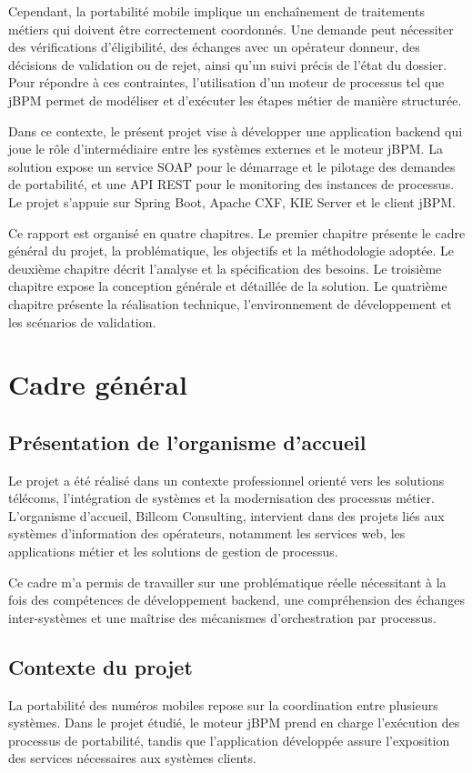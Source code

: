 \documentclass[12pt,a4paper]{report}
\begin{document}
Cependant, la portabilité mobile implique un enchaînement de traitements métiers qui doivent être correctement coordonnés. Une demande peut nécessiter des vérifications d'éligibilité, des échanges avec un opérateur donneur, des décisions de validation ou de rejet, ainsi qu'un suivi précis de l'état du dossier. Pour répondre à ces contraintes, l'utilisation d'un moteur de processus tel que jBPM permet de modéliser et d'exécuter les étapes métier de manière structurée.

Dans ce contexte, le présent projet vise à développer une application backend qui joue le rôle d'intermédiaire entre les systèmes externes et le moteur jBPM. La solution expose un service SOAP pour le démarrage et le pilotage des demandes de portabilité, et une API REST pour le monitoring des instances de processus. Le projet s'appuie sur Spring Boot, Apache CXF, KIE Server et le client jBPM.

Ce rapport est organisé en quatre chapitres. Le premier chapitre présente le cadre général du projet, la problématique, les objectifs et la méthodologie adoptée. Le deuxième chapitre décrit l'analyse et la spécification des besoins. Le troisième chapitre expose la conception générale et détaillée de la solution. Le quatrième chapitre présente la réalisation technique, l'environnement de développement et les scénarios de validation.

\chapter{Cadre général}
\section{Présentation de l'organisme d'accueil}
Le projet a été réalisé dans un contexte professionnel orienté vers les solutions télécoms, l'intégration de systèmes et la modernisation des processus métier. L'organisme d'accueil, Billcom Consulting, intervient dans des projets liés aux systèmes d'information des opérateurs, notamment les services web, les applications métier et les solutions de gestion de processus.

Ce cadre m'a permis de travailler sur une problématique réelle nécessitant à la fois des compétences de développement backend, une compréhension des échanges inter-systèmes et une maîtrise des mécanismes d'orchestration par processus.

\section{Contexte du projet}
La portabilité des numéros mobiles repose sur la coordination entre plusieurs systèmes. Dans le projet étudié, le moteur jBPM prend en charge l'exécution des processus de portabilité, tandis que l'application développée assure l'exposition des services nécessaires aux systèmes clients.
\end{document}
